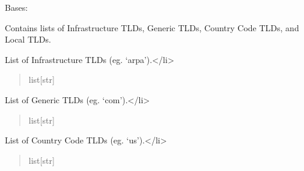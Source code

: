 \documentclass[letterpaper,10pt,english]{sphinxmanual}
\begin{document}
\begin{fulllineitems}
\label{\detokenize{apache_commons_validator_python.util:apache_commons_validator_python.util.domains.Domains}}
\pysigstartsignatures
{}
\pysigstopsignatures
\sphinxAtStartPar
Bases: 

\sphinxAtStartPar
Contains lists of Infrastructure TLDs, Generic TLDs, Country Code TLDs, and Local
TLDs.


\begin{fulllineitems}

\pysigstartsignatures
{}
\pysigstopsignatures
\sphinxAtStartPar
List of Infrastructure TLDs (eg. ‘arpa’).\textless{}/li\textgreater{}
\begin{quote}\begin{description}
\sphinxAtStartPar
list{[}str{]}

\end{description}\end{quote}

\end{fulllineitems}



\begin{fulllineitems}

\pysigstartsignatures
{}
\pysigstopsignatures
\sphinxAtStartPar
List of Generic TLDs (eg. ‘com’).\textless{}/li\textgreater{}
\begin{quote}\begin{description}
\sphinxAtStartPar
list{[}str{]}

\end{description}\end{quote}

\end{fulllineitems}



\begin{fulllineitems}

\pysigstartsignatures
{}
\pysigstopsignatures
\sphinxAtStartPar
List of Country Code TLDs (eg. ‘us’).\textless{}/li\textgreater{}
\begin{quote}\begin{description}
\sphinxAtStartPar
list{[}str{]}


\end{description}
\end{quote}
\end{fulllineitems}
\end{fulllineitems}
\end{document}
